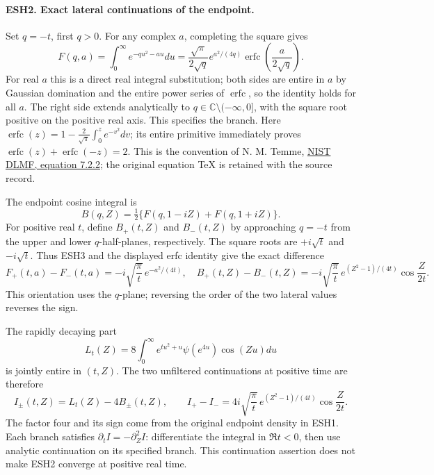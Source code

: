 \paragraph{ESH2. Exact lateral continuations of the endpoint.}
Set \(q=-t\), first \(q>0\). For any complex \(a\),
completing the square gives
\[
 F(q,a)=\int_0^\infty e^{-qu^2-au}du
 =\frac{\sqrt\pi}{2\sqrt q}
       e^{a^2/(4q)}\operatorname{erfc}\!\left(\frac a{2\sqrt q}\right).
                                                               \tag{ESH3}
\]
For real \(a\) this is a direct real integral substitution;
both sides are entire in \(a\) by Gaussian domination and
the entire power series of \(\operatorname{erfc}\), so the
identity holds for all \(a\). The right side extends analytically
to \(q\in\mathbb C\setminus(-\infty,0]\), with the square
root positive on the positive real axis. This specifies the branch.
Here
\(\operatorname{erfc}(z)=1-\frac2{\sqrt\pi}\int_0^z e^{-v^2}dv\);
its entire primitive immediately proves
\(\operatorname{erfc}(z)+\operatorname{erfc}(-z)=2\).
This is the convention of N. M. Temme,
\href{https://dlmf.nist.gov/7.2.E2}{NIST DLMF, equation 7.2.2};
the original equation TeX is retained with the source record.

The endpoint cosine integral is
\[
 B(q,Z)=\tfrac12\{F(q,1-iZ)+F(q,1+iZ)\}.                 \tag{ESH4}
\]
For positive real \(t\), define \(B_+(t,Z)\) and
\(B_-(t,Z)\) by approaching \(q=-t\) from the upper and
lower \(q\)-half-planes, respectively. The square roots are
\(+i\sqrt t\) and \(-i\sqrt t\). Thus ESH3 and the
displayed erfc identity give the exact difference
\[
 F_+(t,a)-F_-(t,a)
       =-i\sqrt{\frac\pi t}\,e^{-a^2/(4t)},
\quad
 B_+(t,Z)-B_-(t,Z)
       =-i\sqrt{\frac\pi t}\,
          e^{(Z^2-1)/(4t)}\cos\!\frac Z{2t}.              \tag{ESH5}
\]
This orientation uses the \(q\)-plane; reversing the order of
the two lateral values reverses the sign.

The rapidly decaying part
\[
 L_t(Z)=8\int_0^\infty e^{tu^2+u}\psi(e^{4u})\cos(Zu)du
\]
is jointly entire in \((t,Z)\). The two unfiltered continuations
at positive time are therefore
\[
 I_\pm(t,Z)=L_t(Z)-4B_\pm(t,Z),\qquad
 I_+-I_-=4i\sqrt{\frac\pi t}\,
                 e^{(Z^2-1)/(4t)}\cos\!\frac Z{2t}.
                                                               \tag{ESH6}
\]
The factor four and its sign come from the original endpoint
density in ESH1. Each branch satisfies
\(\partial_t I=-\partial_Z^2 I\): differentiate the integral
in \(\Re t<0\), then use analytic continuation on its
specified branch. This continuation assertion does not make
ESH2 converge at positive real time.

